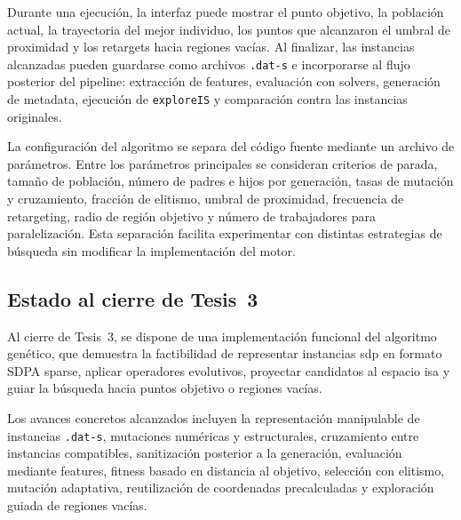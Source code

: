 Durante una ejecución, la interfaz puede mostrar el punto objetivo, la población
actual, la trayectoria del mejor individuo, los puntos que alcanzaron el umbral de
proximidad y los retargets hacia regiones vacías.
Al finalizar, las instancias alcanzadas pueden guardarse como archivos
\texttt{.dat-s} e incorporarse al flujo posterior del pipeline: extracción de
features, evaluación con solvers, generación de metadata, ejecución de
\texttt{exploreIS} y comparación contra las instancias originales.

La configuración del algoritmo se separa del código fuente mediante un archivo de
parámetros.
Entre los parámetros principales se consideran criterios de parada, tamaño de
población, número de padres e hijos por generación, tasas de mutación y cruzamiento,
fracción de elitismo, umbral de proximidad, frecuencia de retargeting, radio de
región objetivo y número de trabajadores para paralelización.
Esta separación facilita experimentar con distintas estrategias de búsqueda sin
modificar la implementación del motor.

\subsection{Estado al cierre de Tesis~3}
\label{subsec:avance_ga_estado}

Al cierre de Tesis~3, se dispone de una implementación funcional del algoritmo
genético, que demuestra la factibilidad de representar instancias \acrshort{sdp} en
formato SDPA sparse, aplicar operadores evolutivos, proyectar candidatos al espacio
\acrshort{isa} y guiar la búsqueda hacia puntos objetivo o regiones vacías.

Los avances concretos alcanzados incluyen la representación manipulable de instancias
\texttt{.dat-s}, mutaciones numéricas y estructurales, cruzamiento entre instancias
compatibles, sanitización posterior a la generación, evaluación mediante features,
fitness basado en distancia al objetivo, selección con elitismo, mutación adaptativa,
reutilización de coordenadas precalculadas y exploración guiada de regiones vacías.
